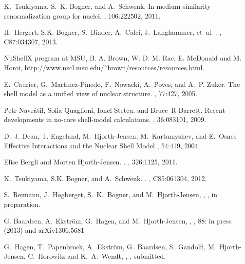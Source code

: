 \begin{thebibliography}{200}
K.~Tsukiyama, S.~K. Bogner, and A.~Schwenk.
\newblock In-medium similarity renormalization group for nuclei.
, 106:222502, 2011.


H.~Hergert, S.K. Bogner, S.~Binder, A.~Calci, J.~Langhammer, et~al.
.
, C87:034307, 2013.

  NuShellX program at MSU, B. A. Brown, W. D. M. Rae, E. McDonald and M. Horoi,
\url{http://www.nscl.msu.edu/˜brown/resources/resources.html}.



E.~Caurier, G.~Martinez-Pinedo, F.~Nowacki, A.~Poves, and A.~P. Zuker.
\newblock The shell model as a unified view of nuclear structure.
, 77:427, 2005.

Petr Navr{\'a}til, Sofia Quaglioni, Ionel Stetcu, and Bruce~R Barrett.
\newblock Recent developments in no-core shell-model calculations.
, 36:083101, 2009.




D.~J. Dean, T. Engeland, M.~Hjorth-Jensen, M.~Kartamyshev, and E.~Osnes
\newblock Effective Interactions and the Nuclear Shell Model
, 54:419, 2004.


Elise Bergli and Morten Hjorth-Jensen.
.
, 326:1125, 2011.

K.~Tsukiyama, S.K. Bogner, and A.~Schwenk.
.
, C85:061304, 2012.

 S.~Reimann, J.~H\o gberget, S.~K.~Bogner, and M.~Hjorth-Jensen, 
, 
, in preparation.


 G. Baardsen, A.\ Ekstr\"om, G.\ Hagen, and M.\ Hjorth-Jensen,
, 
,  88: in press (2013) and arXiv1306.5681



 G.~Hagen, T.~Papenbrock,   A.~Ekstr\"om, G.~Baardsen, S.~Gandolfi, M.~Hjorth-Jensen, C.~Horowitz and K.~A.~Wendt,
, 
,  submitted.



\end{thebibliography}
